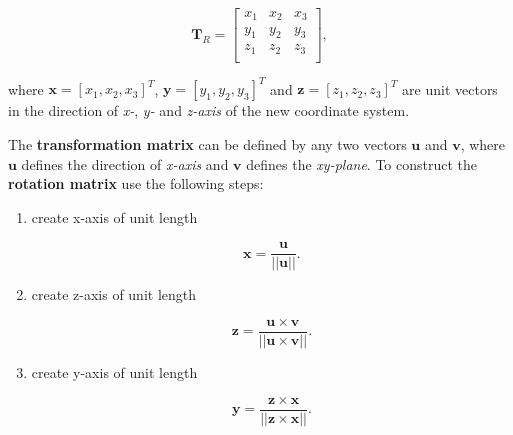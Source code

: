 \begin{enumerate}
        \begin{equation}
            \mathbf{T}_{R} = \begin{bmatrix}
                x_1 & x_2 & x_3 \\
                y_1 & y_2 & y_3 \\
                z_1 & z_2 & z_3 \\
            \end{bmatrix}
        ,\end{equation}

        where $\mathbf{x} = [x_1, x_2, x_3]^{T}$, $\mathbf{y} = [y_1, y_2, y_3]^{T}$
        and  $\mathbf{z} = [z_1, z_2, z_3]^{T}$ are unit vectors in the direction
        of \textit{x-}, \textit{y-} and \textit{z-axis} of the new coordinate
        system.


        \begin{bbox}[0.85]
            The \textbf{transformation matrix} can be defined by any two vectors
            $\mathbf{u}$ and $\mathbf{v}$, where $\mathbf{u}$ defines the direction
            of \textit{x-axis} and $\mathbf{v}$ defines the \textit{xy-plane}.
            To construct the \textbf{rotation matrix} use the following steps:

            \begin{enumerate}
                \item create x-axis of unit length

                    \begin{equation}
                        \mathbf{x} = \frac{\mathbf{u}}{||\mathbf{u}||}
                    .\end{equation}

                \item create z-axis of unit length

                    \begin{equation}
                        \mathbf{z}
                        = \frac{\mathbf{u} \times \mathbf{v}}{||\mathbf{u} \times \mathbf{v}||}
                    .\end{equation}

                \item create y-axis of unit length

                    \begin{equation}
                        \mathbf{y}
                        = \frac{\mathbf{z} \times \mathbf{x}}{||\mathbf{z} \times \mathbf{x}||}
                    .\end{equation}


\end{enumerate}
\end{bbox}
\end{enumerate}
